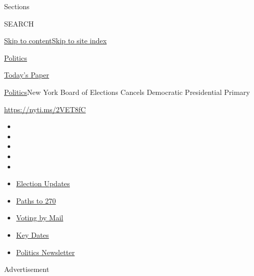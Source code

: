 Sections

SEARCH

\protect\hyperlink{site-content}{Skip to
content}\protect\hyperlink{site-index}{Skip to site index}

\href{https://www.nytimes3xbfgragh.onion/section/politics}{Politics}

\href{https://myaccount.nytimes3xbfgragh.onion/auth/login?response_type=cookie\&client_id=vi}{}

\href{https://www.nytimes3xbfgragh.onion/section/todayspaper}{Today's
Paper}

\href{/section/politics}{Politics}\textbar{}New York Board of Elections
Cancels Democratic Presidential Primary

\url{https://nyti.ms/2VET8fC}

\begin{itemize}
\item
\item
\item
\item
\item
\end{itemize}

\begin{itemize}
\item
  \href{https://www.nytimes3xbfgragh.onion/live/2020/09/07/us/trump-vs-biden?action=click\&pgtype=Article\&state=default\&region=TOP_BANNER\&context=storylines_menu}{Election
  Updates}
\item
  \href{https://www.nytimes3xbfgragh.onion/interactive/2020/us/elections/election-states-biden-trump.html?action=click\&pgtype=Article\&state=default\&region=TOP_BANNER\&context=storylines_menu}{Paths
  to 270}
\item
  \href{https://www.nytimes3xbfgragh.onion/interactive/2020/08/31/us/politics/vote-by-mail-deadlines.html?action=click\&pgtype=Article\&state=default\&region=TOP_BANNER\&context=storylines_menu}{Voting
  by Mail}
\item
  \href{https://www.nytimes3xbfgragh.onion/interactive/2019/us/elections/2020-presidential-election-calendar.html?action=click\&pgtype=Article\&state=default\&region=TOP_BANNER\&context=storylines_menu}{Key
  Dates}
\item
  \href{https://www.nytimes3xbfgragh.onion/newsletters/politics?action=click\&pgtype=Article\&state=default\&region=TOP_BANNER\&context=storylines_menu}{Politics
  Newsletter}
\end{itemize}

Advertisement

